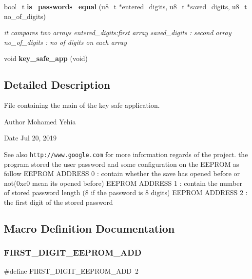 \begin{DoxyCompactItemize}
bool\+\_\+t \textbf{ is\+\_\+passwords\+\_\+equal} (u8\+\_\+t $\ast$entered\+\_\+digits, u8\+\_\+t $\ast$saved\+\_\+digits, u8\+\_\+t no\+\_\+of\+\_\+digits)
\begin{DoxyCompactList}\small\item\em it campares two arrays  entered\+\_\+digits\+:first array  saved\+\_\+digits \+: second array  no\+\_\+of\+\_\+digits \+: no of digits on each array \end{DoxyCompactList}\item 
void \textbf{ key\+\_\+safe\+\_\+app} (void)
\end{DoxyCompactItemize}


\subsection{Detailed Description}
File containing the main of the key safe application. 

\begin{DoxyAuthor}{Author}
Mohamed Yehia 
\end{DoxyAuthor}
\begin{DoxyDate}{Date}
Jul 20, 2019 
\end{DoxyDate}
\begin{DoxySeeAlso}{See also}
{\tt http\+://www.\+google.\+com} for more information regards of the project. the program stored the user password and some configuration on the E\+E\+P\+R\+OM as follow E\+E\+P\+R\+OM A\+D\+D\+R\+E\+SS 0 \+: contain whether the save has opened before or not(0xe0 mean it\textquotesingle{}s opened before) E\+E\+P\+R\+OM A\+D\+D\+R\+E\+SS 1 \+: contain the number of stored password length (8 if the password is 8 digits) E\+E\+P\+R\+OM A\+D\+D\+R\+E\+SS 2 \+: the first digit of the stored password 
\end{DoxySeeAlso}


\subsection{Macro Definition Documentation}
\mbox{\label{keysafe__app_8c_afccca8328f4f14d4aebfb6b9346701ee}} 
\subsubsection{F\+I\+R\+S\+T\+\_\+\+D\+I\+G\+I\+T\+\_\+\+E\+E\+P\+R\+O\+M\+\_\+\+A\+DD}
{\footnotesize\ttfamily \#define F\+I\+R\+S\+T\+\_\+\+D\+I\+G\+I\+T\+\_\+\+E\+E\+P\+R\+O\+M\+\_\+\+A\+DD~2}



